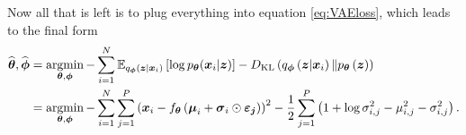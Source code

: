 Now all that is left is to plug everything into equation \eqref{eq:VAEloss}, which leads to the final form
\begin{align}\label{řešení_VAE}
 \widehat{\boldsymbol{\theta}}, \widehat{\boldsymbol{\phi}} & = \mathop{\mathrm{argmin}}_{\boldsymbol{\theta},\boldsymbol{\phi}}-\sum_{i=1}^N\mathbb{E}_{q_{\boldsymbol{\phi}}\left(\boldsymbol{z}\vert \boldsymbol{x}_i \right)}\left[\log p_{\boldsymbol{\theta}}(\boldsymbol{x}_i\vert \boldsymbol{z}) \right] - D_{\mathrm{KL}}\left(q_{\boldsymbol{\phi}}\left(\boldsymbol{z}\vert\boldsymbol{x}_i \right) \Vert p_{\boldsymbol{\theta}}\left(\boldsymbol{z}\right)\right) \\
 & = \mathop{\mathrm{argmin}}_{\boldsymbol{\theta}, \boldsymbol{\phi}}-\sum_{i = 1}^N\sum_{j = 1}^P \left( \boldsymbol{x}_i - f_{\boldsymbol{\theta}}\left(\boldsymbol{\mu}_i + \boldsymbol{\sigma}_i\odot\boldsymbol{\varepsilon_{j}} \right)\right) ^2 -   \frac{1}{2}\sum_{j=1}^P\left(1 + \log\sigma^2_{i,j} -\mu_{i,j}^2 -\sigma_{i,j}^2 \right).
\end{align}

